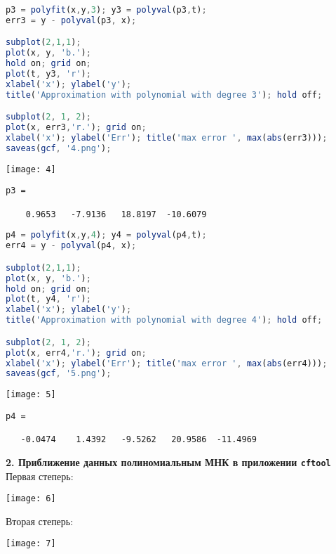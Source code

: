 \documentclass[a4paper]{article}
\begin{document}
\newpage
\begin{lstlisting}[language=Octave, firstnumber=38]
p3 = polyfit(x,y,3); y3 = polyval(p3,t);
err3 = y - polyval(p3, x);

subplot(2,1,1);
plot(x, y, 'b.');
hold on; grid on;
plot(t, y3, 'r');
xlabel('x'); ylabel('y');
title('Approximation with polynomial with degree 3'); hold off;

subplot(2, 1, 2);
plot(x, err3,'r.'); grid on;
xlabel('x'); ylabel('Err'); title('max error ', max(abs(err3)));
saveas(gcf, '4.png');
\end{lstlisting}
\begin{center}
    \texttt{[image: 4]}
\end{center}
{\singlespacing
\begin{verbatim}
p3 =

    0.9653   -7.9136   18.8197  -10.6079
\end{verbatim}}



\newpage
\begin{lstlisting}[language=Octave, firstnumber=52]
p4 = polyfit(x,y,4); y4 = polyval(p4,t);
err4 = y - polyval(p4, x);

subplot(2,1,1);
plot(x, y, 'b.');
hold on; grid on;
plot(t, y4, 'r');
xlabel('x'); ylabel('y');
title('Approximation with polynomial with degree 4'); hold off;

subplot(2, 1, 2);
plot(x, err4,'r.'); grid on;
xlabel('x'); ylabel('Err'); title('max error ', max(abs(err4)));
saveas(gcf, '5.png');
\end{lstlisting}
\begin{center}
    \texttt{[image: 5]}
\end{center}
{\singlespacing
\begin{verbatim}
p4 =

   -0.0474    1.4392   -9.5262   20.9586  -11.4969
\end{verbatim}}



\newpage
{\textbf{2. Приближение данных полиномиальным МНК в приложении \texttt{cftool}}}\\
Первая степерь:
\begin{center}
    \texttt{[image: 6]}
\end{center}
Вторая степерь:
\begin{center}
    \texttt{[image: 7]}
\end{center}
\end{document}
